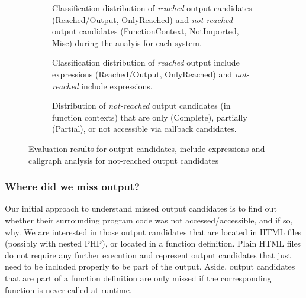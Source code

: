 \documentclass[sigconf]{acmart}
\begin{document}
\begin{figure}[h!]
	\begin{subfigure}[center]{0.48\textwidth}
		
		\caption{
		Classification distribution of \emph{reached} output candidates
		(Reached/Output, OnlyReached) and \emph{not-reached} output candidates
		(FunctionContext, NotImported, Misc) during the analyis for each system.
		\label{coverage}}
	\end{subfigure}
	\vspace{1mm}
	
	\begin{subfigure}[center]{0.48\textwidth}
		
		\caption{
			Classification distribution of \emph{reached} output include expressions
			(Reached/Output, OnlyReached) and \emph{not-reached} include expressions.
			\label{fig:include_coverage_results}
		}
	\end{subfigure}
	\vspace{1mm}
	
	\begin{subfigure}[center]{0.48\textwidth}
		
		\caption{
			Distribution of \emph{not-reached} output candidates (in function contexts)
			that are only (Complete), partially (Partial), or not accessible via callback candidates. 
			\label{fig:output_candidate_explanation}
		}
		
	\end{subfigure}
	\caption{Evaluation results for output candidates, include expressions and
	callgraph analysis for not-reached output candidates}
\end{figure}

\subsubsection{Where did we miss output?}\label{WhatLiteralsDidWeMiss?}
Our initial approach to understand missed output candidates is to find out
whether their surrounding program code was not accessed/accessible, and if so,
why. We are interested in those output candidates that are located in HTML
files (possibly with nested PHP), or located in a function definition. Plain
HTML files do not require any further execution and represent output candidates
that just need to be included properly to be part of the output. Aside, output
candidates that are part of a function definition are only missed if the
corresponding function is never called at runtime.
\end{document}
